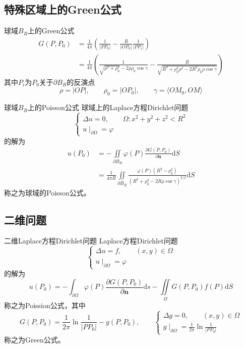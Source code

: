 \documentclass[lang = cn, scheme = chinese, thmcnt = section]{elegantbook}
\newcommand{\bs}{\boldsymbol}          %
\newcommand{\dd}{\mathrm{d}}           %
\newcommand{\IInt}{\iint\limits}
\begin{document}
\subsection{特殊区域上的Green公式}

\begin{theorem}{球域$B_R$上的Green公式}
	\begin{align*}
		G(P,P_0)
		& = \frac{1}{4\pi}\left(\frac{1}{|PP_0|}-\frac{R}{|OP_0|}\frac{1}{|PP_i|}\right)\\
		& = \frac{1}{4\pi}\left(\frac{1}{\sqrt{\rho^2+\rho_0^2}-2\rho\rho_0\cos\gamma}-\frac{R}{\sqrt{R^4+\rho_0^2\rho^2-2R^2\rho_0\rho\cos\gamma}}\right)
	\end{align*}
	其中$P_i$为$P_0$关于$\partial B_R$的反演点%
	$$
	\rho=|OP|,\qquad
	\rho_0=|OP_0|,\qquad
	\gamma=\langle OM_0,OM \rangle
	$$
\end{theorem}

\begin{theorem}{球域$B_R$上的Poisson公式}
	球域上的Laplace方程Dirichlet问题
	$$
	\begin{cases}
		\Delta u=0,\qquad \Omega:x^2+y^2+z^2<R^2\\
		u\mid_{\partial \Omega}=\varphi
	\end{cases}
	$$
	的解为%
	\begin{align*}
		u(P_0)
		& = -\IInt_{\partial B_R}\varphi(P)\frac{\partial G(P,P_0)}{\partial\bs{n}}\dd S\\
		& = \frac{1}{4\pi R}\IInt_{\partial B_R}\frac{\varphi(P)(R^2-\rho_0^2)}{(R^2+\rho_0^2-2R\rho\cos\gamma)^{3/2}}\dd S
	\end{align*}
	称之为球域的Poisson公式。
\end{theorem}

\subsection{二维问题}

\begin{theorem}{二维Laplace方程Dirichlet问题}
	Laplace方程Dirichlet问题%
	$$
	\begin{cases}
		\Delta u=f,\qquad (x,y)\in\Omega\\
		u\mid_{\partial\Omega}=\varphi
	\end{cases}
	$$
	的解为%
	$$
	u(P_0)=-\int_{\partial\Omega}\varphi(P)\frac{\partial G(P,P_0)}{\partial\bs{n}}\dd s-\IInt_{\Omega}G(P,P_0)f(P)\dd S
	$$
	称之为Poission公式，其中
	$$
	G(P,P_0)=\frac{1}{2\pi}\ln\frac{1}{|PP_0|}-g(P,P_0),\qquad
	\begin{cases}
		\Delta g=0,\qquad (x,y)\in\Omega\\
		g\mid_{\partial\Omega}=\frac{1}{2\pi}\ln\frac{1}{|PP_0|}
	\end{cases}
	$$
	称之为Green公式。
\end{theorem}
\end{document}

